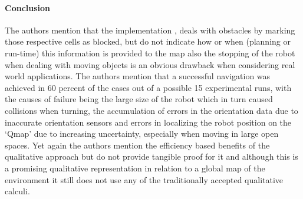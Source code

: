 	\paragraph{Conclusion}The authors mention that the implementation \cite{sgouros2002qualitative}, deals with obstacles by marking those respective cells as blocked, but do not indicate how or when (planning or run-time) this information is provided to the map also the stopping of the robot when dealing with moving objects is an obvious drawback when considering real world applications. The authors mention that a successful navigation was achieved in 60 percent of the cases out of a possible 15 experimental runs, with the causes of failure being the large size of the robot which in turn caused collisions when turning, the accumulation of errors in the orientation data due to inaccurate orientation sensors and errors in localizing the robot position on the `Qmap' due to increasing uncertainty, especially when moving in large open spaces. Yet again the authors mention the efficiency based benefits of the qualitative approach but do not provide tangible proof for it and although this is a promising qualitative representation in relation to a global map of the environment it still does not use any of the traditionally accepted qualitative calculi.
	

